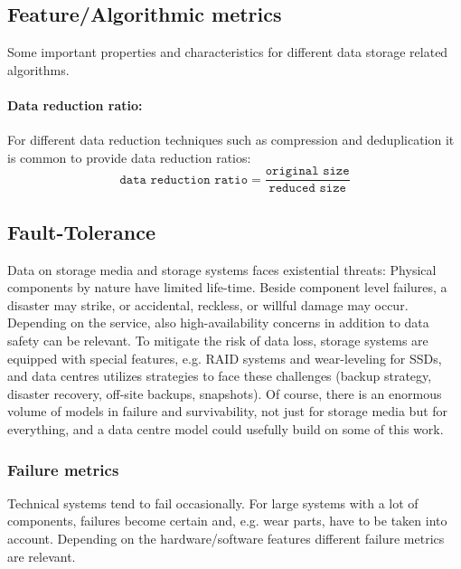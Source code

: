 \subsection{Feature/Algorithmic metrics}
Some important properties and characteristics for different data storage related algorithms.


\paragraph{Data reduction ratio:}
For different data reduction techniques such as compression and deduplication it is common to provide data reduction ratios:
$$\texttt{data reduction ratio} = \frac{\texttt{original size}}{\texttt{reduced size}}$$


\subsection{Fault-Tolerance}
\label{sec:fault_tol}

Data on storage media and storage systems faces existential threats:
Physical components by nature have limited life-time.
Beside component level failures, a disaster may strike, or accidental, reckless, or willful damage may occur.
Depending on the service, also high-availability concerns in addition to data safety can be relevant.
To mitigate the risk of data loss, storage systems are equipped with special features, e.g. RAID systems and wear-leveling for SSDs, and data centres utilizes strategies to face these challenges (backup strategy, disaster recovery, off-site backups, snapshots).
Of course, there is an enormous volume of models in failure and survivability, not just for storage media but for
everything, and a data centre model could usefully build on some of this work.

\subsubsection{Failure metrics}

Technical systems tend to fail occasionally. For large systems with a lot of
components, failures become certain and, e.g. wear parts, have to be taken into account.
Depending on the hardware/software features different failure metrics are relevant.

